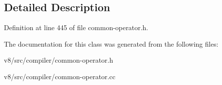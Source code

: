 \subsection{Detailed Description}


Definition at line 445 of file common-\/operator.\+h.



The documentation for this class was generated from the following files\+:\begin{DoxyCompactItemize}
\item 
v8/src/compiler/common-\/operator.\+h\item 
v8/src/compiler/common-\/operator.\+cc\end{DoxyCompactItemize}
